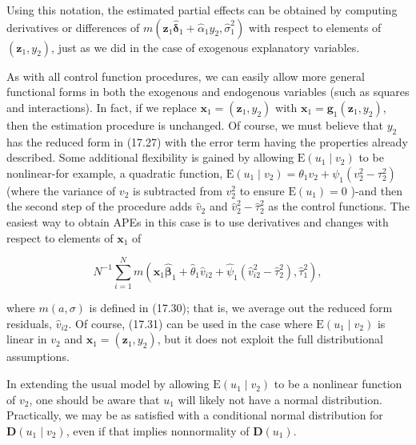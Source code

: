 \documentclass[10pt]{article}
\begin{document}
Using this notation, the estimated partial effects can be obtained by computing derivatives or differences of $m\left(\mathbf{z}_{1} \hat{\boldsymbol{\delta}}_{1}+\hat{\alpha}_{1} y_{2}, \hat{\sigma}_{1}^{2}\right)$ with respect to elements of $\left(\mathbf{z}_{1}, y_{2}\right)$, just as we did in the case of exogenous explanatory variables.

As with all control function procedures, we can easily allow more general functional forms in both the exogenous and endogenous variables (such as squares and interactions). In fact, if we replace $\mathbf{x}_{1}=\left(\mathbf{z}_{1}, y_{2}\right)$ with $\mathbf{x}_{1}=\mathbf{g}_{1}\left(\mathbf{z}_{1}, y_{2}\right)$, then the estimation procedure is unchanged. Of course, we must believe that $y_{2}$ has the reduced form in (17.27) with the error term having the properties already described. Some additional flexibility is gained by allowing $\mathrm{E}\left(u_{1} \mid v_{2}\right)$ to be nonlinear-for example, a quadratic function, $\mathrm{E}\left(u_{1} \mid v_{2}\right)=\theta_{1} v_{2}+\psi_{1}\left(v_{2}^{2}-\tau_{2}^{2}\right)$ (where the variance of $v_{2}$ is subtracted from $v_{2}^{2}$ to ensure $\mathrm{E}\left(u_{1}\right)=0$ )-and then the second step of the procedure adds $\hat{v}_{2}$ and $\hat{v}_{2}^{2}-\hat{\tau}_{2}^{2}$ as the control functions. The easiest way to obtain APEs in this case is to use derivatives and changes with respect to elements of $\mathbf{x}_{1}$ of


\begin{equation*}
N^{-1} \sum_{i=1}^{N} m\left(\mathbf{x}_{1} \hat{\boldsymbol{\beta}}_{1}+\hat{\theta}_{1} \hat{v}_{i 2}+\hat{\psi}_{1}\left(\hat{v}_{i 2}^{2}-\hat{\tau}_{2}^{2}\right), \hat{\tau}_{1}^{2}\right), \tag{17.31}
\end{equation*}


where $m(a, \sigma)$ is defined in (17.30); that is, we average out the reduced form residuals, $\hat{v}_{i 2}$. Of course, (17.31) can be used in the case where $\mathrm{E}\left(u_{1} \mid v_{2}\right)$ is linear in $v_{2}$ and $\mathbf{x}_{1}=\left(\mathbf{z}_{1}, y_{2}\right)$, but it does not exploit the full distributional assumptions.

In extending the usual model by allowing $\mathrm{E}\left(u_{1} \mid v_{2}\right)$ to be a nonlinear function of $v_{2}$, one should be aware that $u_{1}$ will likely not have a normal distribution. Practically, we may be as satisfied with a conditional normal distribution for $\mathbf{D}\left(u_{1} \mid v_{2}\right)$, even if that implies nonnormality of $\mathbf{D}\left(u_{1}\right)$.
\end{document}
